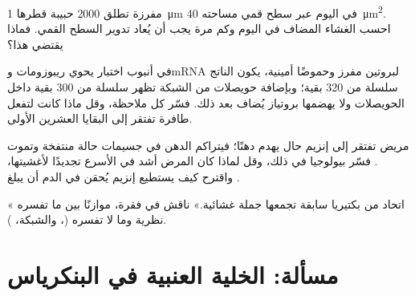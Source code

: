 \begin{exercise}[$\star\star$]\label{exo:b1:eukaryotic-cell:9}
 مفرزة تطلق \qty{2000}{} حبيبة قطرها \qty{1}{\micro m} في اليوم
عبر سطح قمي مساحته \qty{40}{\micro m^2}. احسب الغشاء المضاف في اليوم
وكم مرة يجب أن يُعاد تدوير السطح القمي. فماذا يقتضي هذا؟
\end{exercise}

\begin{exercise}[$\star\star\star$]\label{exo:b1:eukaryotic-cell:10}
في أنبوب اختبار يحوي ريبوزومات وmRNA لبروتين مفرز وحموضًا أمينية،
يكون الناتج سلسلة من \qty{320}{} بقية؛ وبإضافة حويصلات من الشبكة
تظهر سلسلة من \qty{300}{} بقية داخل الحويصلات ولا يهضمها بروتياز
يُضاف بعد ذلك. فسّر كل ملاحظة، وقل ماذا كانت لتفعل طافرة تفتقر إلى
البقايا العشرين الأولى.
\end{exercise}

\begin{exercise}[$\star\star\star$]\label{exo:b1:eukaryotic-cell:11}
 مريض تفتقر إلى إنزيم حال يهدم دهنًا؛ فيتراكم الدهن في جسيمات
حالة منتفخة وتموت . فسّر بيولوجيا  في ذلك، وقل لماذا
كان المرض أشد في  الأسرع تجديدًا لأغشيتها، واقترح كيف يستطيع
إنزيم يُحقن في الدم أن يبلغ .
\end{exercise}

\begin{exercise}[$\star\star\star$]\label{exo:b1:eukaryotic-cell:12}
« اتحاد من بكتيريا سابقة تجمعها جملة غشائية.»
ناقش في فقرة، موازنًا بين ما تفسره نظرية  وما لا
تفسره (، والشبكة، ).
\end{exercise}

\section{مسألة: الخلية العنبية في البنكرياس}


